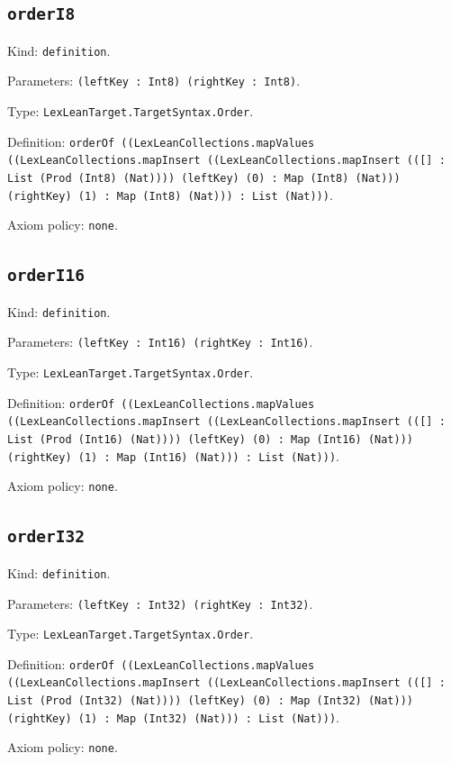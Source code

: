 \documentclass[11pt]{article}
\begin{document}
\subsection*{\texttt{orderI8}}
\noindent Kind: \texttt{definition}.\par
\noindent Parameters: \texttt{(leftKey : Int8) (rightKey : Int8)}.\par
\noindent Type: \texttt{LexLeanTarget.TargetSyntax.Order}.\par
\noindent Definition: \texttt{orderOf ((LexLeanCollections.mapValues ((LexLeanCollections.mapInsert ((LexLeanCollections.mapInsert (([] : List (Prod (Int8) (Nat)))) (leftKey) (0) : Map (Int8) (Nat))) (rightKey) (1) : Map (Int8) (Nat))) : List (Nat)))}.\par
\noindent Axiom policy: \texttt{none}.\par
\subsection*{\texttt{orderI16}}
\noindent Kind: \texttt{definition}.\par
\noindent Parameters: \texttt{(leftKey : Int16) (rightKey : Int16)}.\par
\noindent Type: \texttt{LexLeanTarget.TargetSyntax.Order}.\par
\noindent Definition: \texttt{orderOf ((LexLeanCollections.mapValues ((LexLeanCollections.mapInsert ((LexLeanCollections.mapInsert (([] : List (Prod (Int16) (Nat)))) (leftKey) (0) : Map (Int16) (Nat))) (rightKey) (1) : Map (Int16) (Nat))) : List (Nat)))}.\par
\noindent Axiom policy: \texttt{none}.\par
\subsection*{\texttt{orderI32}}
\noindent Kind: \texttt{definition}.\par
\noindent Parameters: \texttt{(leftKey : Int32) (rightKey : Int32)}.\par
\noindent Type: \texttt{LexLeanTarget.TargetSyntax.Order}.\par
\noindent Definition: \texttt{orderOf ((LexLeanCollections.mapValues ((LexLeanCollections.mapInsert ((LexLeanCollections.mapInsert (([] : List (Prod (Int32) (Nat)))) (leftKey) (0) : Map (Int32) (Nat))) (rightKey) (1) : Map (Int32) (Nat))) : List (Nat)))}.\par
\noindent Axiom policy: \texttt{none}.\par
\end{document}
